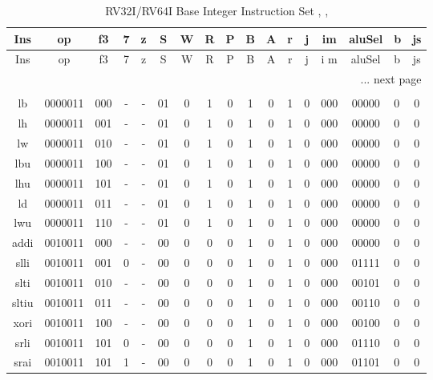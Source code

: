 \begin{longtable}{|c<{\raggedright}|c<{\raggedright}|c<{\raggedright}|c|c|c|c|c|c|c|c|c|c|c|c|p{0.3cm}|c|} %
\caption{RV32I/RV64I Base Integer Instruction Set \cite{riscvisa01}, \cite{riscvisa02}, \cite{riscvisa03}}\\
\hline
Ins & op & f3 & 7 &  z & S & W & R& P & B & A & r & j & im & aluSel & b & js  \\
\hline
\endfirsthead
Ins & op & f3 & 7 &   z & S & W & R & P & B & A & r & j & i m& aluSel & b & js  \\
\hline
\endhead
\multicolumn{17}{r}{... next page}\\
\endfoot
\hline
\multicolumn{17}{r}{EoT} \\
\endlastfoot
lb & 0000011 & 000 & - & - & 01 & 0 & 1 & 0 & 1 & 0 & 1 & 0 & 000 & 00000 & 0 & 0 \\
\hline
lh & 0000011 & 001 & - & - & 01 & 0 & 1 & 0 & 1 & 0 & 1 & 0 & 000 & 00000 & 0 & 0 \\
\hline
lw & 0000011 & 010 & - & - & 01 & 0 & 1 & 0 & 1 & 0 & 1 & 0 & 000 & 00000 & 0 & 0 \\
\hline
lbu & 0000011 & 100 & - & - & 01 & 0 & 1 & 0 & 1 & 0 & 1 & 0 & 000 & 00000 & 0 & 0 \\
\hline
lhu & 0000011 & 101 & - & - & 01 & 0 & 1 & 0 & 1 & 0 & 1 & 0 & 000 & 00000 & 0 & 0 \\
\hline
ld & 0000011 & 011 & - & - & 01 & 0 & 1 & 0 & 1 & 0 & 1 & 0 & 000 & 00000 & 0 & 0 \\
\hline
lwu & 0000011 & 110 & - & - & 01 & 0 & 1 & 0 & 1 & 0 & 1 & 0 & 000 & 00000 & 0 & 0 \\
\hline
addi & 0010011 & 000 & - & - & 00 & 0 & 0 & 0 & 1 & 0 & 1 & 0 & 000 & 00000 & 0 & 0 \\
\hline
slli & 0010011 & 001 & 0 & - & 00 & 0 & 0 & 0 & 1 & 0 & 1 & 0 & 000 & 01111 & 0 & 0  \\
\hline
slti & 0010011 & 010 & - & - & 00 & 0 & 0 & 0 & 1 & 0 & 1 & 0 & 000 & 00101 & 0 & 0  \\
\hline
sltiu & 0010011 & 011 & - & - & 00 & 0 & 0 & 0 & 1 & 0 & 1 & 0 & 000 & 00110 & 0 & 0  \\
\hline
xori & 0010011 & 100 & - & - & 00 & 0 & 0 & 0 & 1 & 0 & 1 & 0 & 000 & 00100 & 0 & 0  \\
\hline
srli & 0010011 & 101 & 0 & - & 00 & 0 & 0 & 0 & 1 & 0 & 1 & 0 & 000 & 01110 & 0 & 0  \\
\hline
srai & 0010011 & 101 & 1 & - & 00 & 0 & 0 & 0 & 1 & 0 & 1 & 0 & 000 & 01101 & 0 & 0  \\

\end{longtable}
